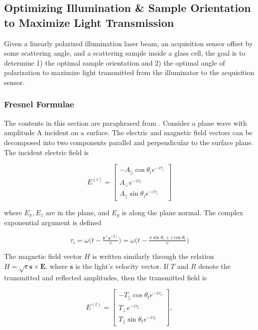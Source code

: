 \subsection{Optimizing Illumination \& Sample Orientation to Maximize Light Transmission}
Given a linearly polarized illumination laser beam, an acquisition sensor offset by some scattering angle, and a scattering sample inside a glass cell, the goal is to determine 1) the optimal sample orientation and 2) the optimal angle of polarization to maximize light transmitted from the illuminator to the acquisition sensor.

\subsubsection{Fresnel Formulae}
The contents in this section are paraphrased from \cite{born2013principles}. Consider a plane wave with amplitude A incident on a surface. The electric and magnetic field vectors can be decomposed into two components parallel and perpendicular to the surface plane. The incident electric field is

\begin{equation}
    E^{(i)} = 
    \begin{bmatrix}
        -A_{||} \cos{\theta_i} e^{-i \tau_i} \\
        A_\perp e^{-i \tau_i} \\
        A_{||} \sin{\theta_i} e^{-i \tau_i}
    \end{bmatrix}
\end{equation}

where $E_x, E_z$ are in the plane, and $E_y$ is along the plane normal. The complex exponential argument is defined

\begin{equation}
    \tau_i = \omega \big( t - \tfrac{\mathbf{r}^\intercal \mathbf{s^{(i)}}}{v} \big) = \omega \big( t - \tfrac{x \sin{\theta_i} + z \cos{\theta_i}}{v} \big)
\end{equation}

The magnetic field vector $H$ is written similarly through the relation $H = \sqrt{\epsilon} \mathbf{s} \times \mathbf{E}$.
where $\mathbf{s}$ is the light's velocity vector. If $T$ and $R$ denote the transmitted and reflected amplitudes, then the transmitted field is

\begin{equation}
    E^{(t)} = 
    \begin{bmatrix}
        -T_{||} \cos{\theta_t} e^{-i \tau_t} \\
        T_\perp e^{-i \tau_t} \\
        T_{||} \sin{\theta_t} e^{-i \tau_t}
    \end{bmatrix},
\end{equation}

